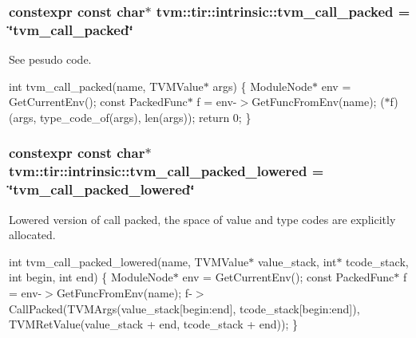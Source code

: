 \subsubsection[{\texorpdfstring{tvm\+\_\+call\+\_\+packed}{tvm_call_packed}}]{\setlength{\rightskip}{0pt plus 5cm}constexpr const char$\ast$ tvm\+::tir\+::intrinsic\+::tvm\+\_\+call\+\_\+packed = \char`\"{}tvm\+\_\+call\+\_\+packed\char`\"{}}\hypertarget{namespacetvm_1_1tir_1_1intrinsic_ac49ed1daf574a2544c8d3cbe3110d6c9}{}\label{namespacetvm_1_1tir_1_1intrinsic_ac49ed1daf574a2544c8d3cbe3110d6c9}


See pesudo code. 

int tvm\+\_\+call\+\_\+packed(name, T\+V\+M\+Value$\ast$ args) \{ Module\+Node$\ast$ env = Get\+Current\+Env(); const Packed\+Func$\ast$ f = env-\/$>$Get\+Func\+From\+Env(name); ($\ast$f)(args, type\+\_\+code\+\_\+of(args), len(args)); return 0; \} 
\subsubsection[{\texorpdfstring{tvm\+\_\+call\+\_\+packed\+\_\+lowered}{tvm_call_packed_lowered}}]{\setlength{\rightskip}{0pt plus 5cm}constexpr const char$\ast$ tvm\+::tir\+::intrinsic\+::tvm\+\_\+call\+\_\+packed\+\_\+lowered = \char`\"{}tvm\+\_\+call\+\_\+packed\+\_\+lowered\char`\"{}}\hypertarget{namespacetvm_1_1tir_1_1intrinsic_ad1044b04b108f8d72d8468c7df8a426f}{}\label{namespacetvm_1_1tir_1_1intrinsic_ad1044b04b108f8d72d8468c7df8a426f}


Lowered version of call packed, the space of value and type codes are explicitly allocated. 

int tvm\+\_\+call\+\_\+packed\+\_\+lowered(name, T\+V\+M\+Value$\ast$ value\+\_\+stack, int$\ast$ tcode\+\_\+stack, int begin, int end) \{ Module\+Node$\ast$ env = Get\+Current\+Env(); const Packed\+Func$\ast$ f = env-\/$>$Get\+Func\+From\+Env(name); f-\/$>$Call\+Packed(T\+V\+M\+Args(value\+\_\+stack\mbox{[}begin\+:end\mbox{]}, tcode\+\_\+stack\mbox{[}begin\+:end\mbox{]}), T\+V\+M\+Ret\+Value(value\+\_\+stack + end, tcode\+\_\+stack + end)); \} 
